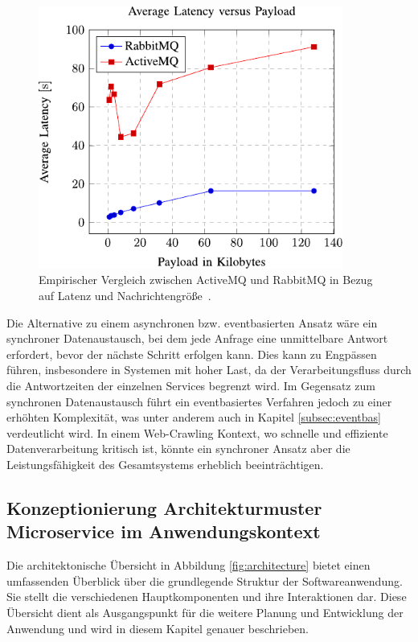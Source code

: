   \begin{figure}[H]
    \centering
    \includegraphics[width=10cm]{images/40_concept/Performance_Evaluation_of_Advanced_Message_Queuing_Protocol_AMQP_An_Empirical_Analysis_of_AMQP_Online_Message1_Brokers.pdf}
    \caption[Empirischer Vergleich zwischen ActiveMQ und RabbitMQ]{Empirischer Vergleich zwischen ActiveMQ und RabbitMQ in Bezug auf Latenz und Nachrichtengröße~\parencite[vgl.][]{9615705}{}{}.}
    \label{fig:RABACTIVE}
\end{figure}
Die Alternative zu einem asynchronen bzw. eventbasierten Ansatz wäre ein synchroner Datenaustausch, bei dem jede Anfrage eine unmittelbare Antwort erfordert, bevor der nächste Schritt erfolgen kann. Dies kann zu Engpässen führen, insbesondere in Systemen mit hoher Last, da der Verarbeitungsfluss durch die Antwortzeiten der einzelnen Services begrenzt wird. Im Gegensatz zum synchronen Datenaustausch führt ein eventbasiertes Verfahren jedoch zu einer erhöhten Komplexität, was unter anderem auch in Kapitel \ref{subsec:eventbas} verdeutlicht wird. In einem Web-Crawling Kontext, wo schnelle und effiziente Datenverarbeitung kritisch ist, könnte ein synchroner Ansatz aber die Leistungsfähigkeit des Gesamtsystems erheblich beeinträchtigen.

\subsection[Konzeptionierung Microservice im Anwendungskontext]{Konzeptionierung Architekturmuster Microservice im Anwendungskontext}
Die architektonische Übersicht in Abbildung \ref{fig:architecture} bietet einen umfassenden Überblick über die grundlegende Struktur der Softwareanwendung. Sie stellt die verschiedenen Hauptkomponenten und ihre Interaktionen dar. Diese Übersicht dient als Ausgangspunkt für die weitere Planung und Entwicklung der Anwendung und wird in diesem Kapitel genauer beschrieben.

